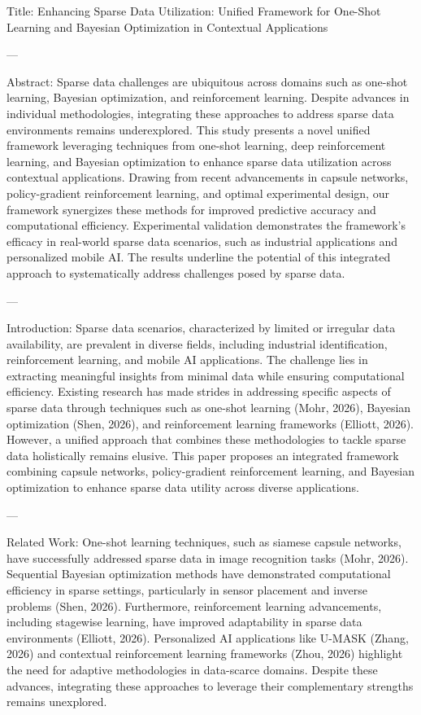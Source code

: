 Title: Enhancing Sparse Data Utilization: Unified Framework for One-Shot Learning and Bayesian Optimization in Contextual Applications  

---

Abstract:  
Sparse data challenges are ubiquitous across domains such as one-shot learning, Bayesian optimization, and reinforcement learning. Despite advances in individual methodologies, integrating these approaches to address sparse data environments remains underexplored. This study presents a novel unified framework leveraging techniques from one-shot learning, deep reinforcement learning, and Bayesian optimization to enhance sparse data utilization across contextual applications. Drawing from recent advancements in capsule networks, policy-gradient reinforcement learning, and optimal experimental design, our framework synergizes these methods for improved predictive accuracy and computational efficiency. Experimental validation demonstrates the framework’s efficacy in real-world sparse data scenarios, such as industrial applications and personalized mobile AI. The results underline the potential of this integrated approach to systematically address challenges posed by sparse data.

---

Introduction:  
Sparse data scenarios, characterized by limited or irregular data availability, are prevalent in diverse fields, including industrial identification, reinforcement learning, and mobile AI applications. The challenge lies in extracting meaningful insights from minimal data while ensuring computational efficiency. Existing research has made strides in addressing specific aspects of sparse data through techniques such as one-shot learning (Mohr, 2026), Bayesian optimization (Shen, 2026), and reinforcement learning frameworks (Elliott, 2026). However, a unified approach that combines these methodologies to tackle sparse data holistically remains elusive. This paper proposes an integrated framework combining capsule networks, policy-gradient reinforcement learning, and Bayesian optimization to enhance sparse data utility across diverse applications.

---

Related Work:  
One-shot learning techniques, such as siamese capsule networks, have successfully addressed sparse data in image recognition tasks (Mohr, 2026). Sequential Bayesian optimization methods have demonstrated computational efficiency in sparse settings, particularly in sensor placement and inverse problems (Shen, 2026). Furthermore, reinforcement learning advancements, including stagewise learning, have improved adaptability in sparse data environments (Elliott, 2026). Personalized AI applications like U-MASK (Zhang, 2026) and contextual reinforcement learning frameworks (Zhou, 2026) highlight the need for adaptive methodologies in data-scarce domains. Despite these advances, integrating these approaches to leverage their complementary strengths remains unexplored.

